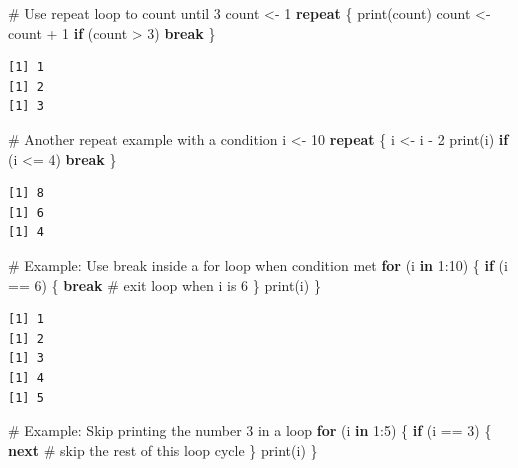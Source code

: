 \documentclass[
  letterpaper,
  DIV=11,
  numbers=noendperiod]{scrartcl}
\newenvironment{Shaded}{\begin{snugshade}}{\end{snugshade}}
\newcommand{\CommentTok}[1]{\textcolor[rgb]{0.37,0.37,0.37}{#1}}
\newcommand{\ControlFlowTok}[1]{\textcolor[rgb]{0.00,0.23,0.31}{\textbf{#1}}}
\newcommand{\DecValTok}[1]{\textcolor[rgb]{0.68,0.00,0.00}{#1}}
\newcommand{\FunctionTok}[1]{\textcolor[rgb]{0.28,0.35,0.67}{#1}}
\newcommand{\NormalTok}[1]{\textcolor[rgb]{0.00,0.23,0.31}{#1}}
\newcommand{\OtherTok}[1]{\textcolor[rgb]{0.00,0.23,0.31}{#1}}
\newcommand{\SpecialCharTok}[1]{\textcolor[rgb]{0.37,0.37,0.37}{#1}}
\begin{document}
\begin{Shaded}
\begin{Highlighting}[]
\CommentTok{\#   Use repeat loop to count until 3}
\NormalTok{count }\OtherTok{\textless{}{-}} \DecValTok{1}
\ControlFlowTok{repeat}\NormalTok{ \{}
  \FunctionTok{print}\NormalTok{(count)}
\NormalTok{  count }\OtherTok{\textless{}{-}}\NormalTok{ count }\SpecialCharTok{+} \DecValTok{1}
  \ControlFlowTok{if}\NormalTok{ (count }\SpecialCharTok{\textgreater{}} \DecValTok{3}\NormalTok{) }\ControlFlowTok{break}
\NormalTok{\}}
\end{Highlighting}
\end{Shaded}

\begin{verbatim}
[1] 1
[1] 2
[1] 3
\end{verbatim}

\begin{Shaded}
\begin{Highlighting}[]
\CommentTok{\#   Another repeat example with a condition}
\NormalTok{i }\OtherTok{\textless{}{-}} \DecValTok{10}
\ControlFlowTok{repeat}\NormalTok{ \{}
\NormalTok{  i }\OtherTok{\textless{}{-}}\NormalTok{ i }\SpecialCharTok{{-}} \DecValTok{2}
  \FunctionTok{print}\NormalTok{(i)}
  \ControlFlowTok{if}\NormalTok{ (i }\SpecialCharTok{\textless{}=} \DecValTok{4}\NormalTok{) }\ControlFlowTok{break}
\NormalTok{\}}
\end{Highlighting}
\end{Shaded}

\begin{verbatim}
[1] 8
[1] 6
[1] 4
\end{verbatim}

\begin{Shaded}
\begin{Highlighting}[]
\CommentTok{\# Example: Use break inside a for loop when condition met}
\ControlFlowTok{for}\NormalTok{ (i }\ControlFlowTok{in} \DecValTok{1}\SpecialCharTok{:}\DecValTok{10}\NormalTok{) \{}
  \ControlFlowTok{if}\NormalTok{ (i }\SpecialCharTok{==} \DecValTok{6}\NormalTok{) \{}
    \ControlFlowTok{break}  \CommentTok{\# exit loop when i is 6}
\NormalTok{  \}}
  \FunctionTok{print}\NormalTok{(i)}
\NormalTok{\}}
\end{Highlighting}
\end{Shaded}

\begin{verbatim}
[1] 1
[1] 2
[1] 3
[1] 4
[1] 5
\end{verbatim}

\begin{Shaded}
\begin{Highlighting}[]
\CommentTok{\# Example: Skip printing the number 3 in a loop}
\ControlFlowTok{for}\NormalTok{ (i }\ControlFlowTok{in} \DecValTok{1}\SpecialCharTok{:}\DecValTok{5}\NormalTok{) \{}
  \ControlFlowTok{if}\NormalTok{ (i }\SpecialCharTok{==} \DecValTok{3}\NormalTok{) \{}
    \ControlFlowTok{next}  \CommentTok{\# skip the rest of this loop cycle}
\NormalTok{  \}}
  \FunctionTok{print}\NormalTok{(i)}
\NormalTok{\}}
\end{Highlighting}
\end{Shaded}
\end{document}
